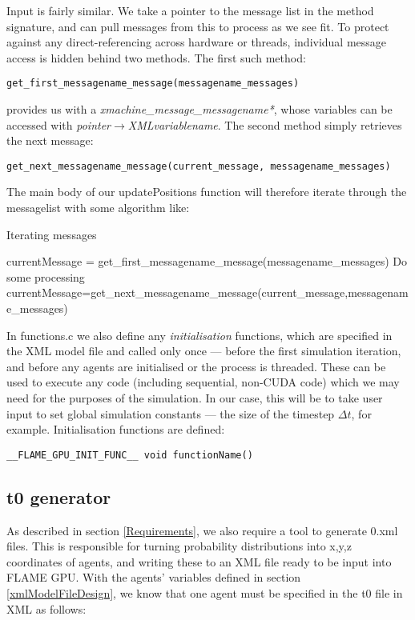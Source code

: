 \documentclass[11pt,a4paper]{article}
\begin{document}
Input is fairly similar. We take a pointer to the message list in the method signature, and can pull messages from this to process as we see fit. To protect against any direct-referencing across hardware or threads, individual message access is hidden behind two methods. The first such method:
\begin{lstlisting}
get_first_messagename_message(messagename_messages) 
\end{lstlisting}
\noindent provides us with a \emph{xmachine\_message\_messagename*}, whose variables can be accessed with \emph{pointer$\to$XMLvariablename}. The second method simply retrieves the next message:

\begin{lstlisting}
get_next_messagename_message(current_message, messagename_messages)
\end{lstlisting}

\noindent The main body of our updatePositions function will therefore iterate through the messagelist with some algorithm like:
\begin{algorithm}[H]
\caption{Iterating messages}
\label{messageIteration}
\begin{algorithmic}
\STATE currentMessage = get\_first\_messagename\_message(messagename\_messages)
  \STATE Do some processing
  \STATE currentMessage=get\_next\_messagename\_message(current\_message,messagename\_messages)
\ENDWHILE
\end{algorithmic}
\end{algorithm}

\noindent In functions.c we also define any \emph{initialisation} functions, which are specified in the XML model file and called only once --- before the first simulation iteration, and before any agents are initialised or the process is threaded. These can be used to execute any code (including sequential, non-CUDA code) which we may need for the purposes of the simulation. In our case, this will be to take user input to set global simulation constants --- the size of the timestep $\Delta t$, for example. Initialisation functions are defined:

\begin{lstlisting}
__FLAME_GPU_INIT_FUNC__ void functionName()
\end{lstlisting}

\subsection{t0 generator}
As described in section \ref{Requirements}, we also require a tool to generate 0.xml files. This is responsible for turning probability distributions into x,y,z coordinates of agents, and writing these to an XML file ready to be input into FLAME GPU. With the agents' variables defined in section \ref{xmlModelFileDesign}, we know that one agent must be specified in the t0 file in XML as follows:
\end{document}

